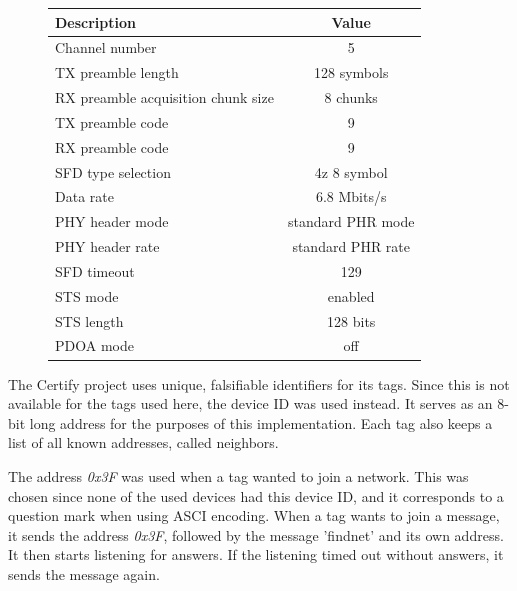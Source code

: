 \begin{figure}[ht]
\caption{Configurations of the DWM3000 for UWB communication}
\begin{longtable}{|l|c|}
\hline
\textbf{Description} & \textbf{Value} \\
\hline
\endfirsthead
\hline
\endfoot
Channel number & 5 \\
TX preamble length & 128 symbols \\
RX preamble acquisition chunk size & 8 chunks \\
TX preamble code & 9 \\
RX preamble code & 9 \\
SFD type selection & 4z 8 symbol\\
Data rate & 6.8 Mbits/s \\
PHY header mode & standard PHR mode \\
PHY header rate & standard PHR rate \\
SFD timeout & 129 \\
STS mode & enabled \\
STS length & 128 bits \\
PDOA mode & off \\
\hline
\end{longtable}
\label{table:DWM_settings}
\end{figure}


The Certify project uses unique, falsifiable identifiers for its tags.
Since this is not available for the tags used here, the device ID was used instead.
It serves as an 8-bit long address for the purposes of this implementation.
Each tag also keeps a list of all known addresses, called neighbors.


The address \textit{0x3F} was used when a tag wanted to join a network.
This was chosen since none of the used devices had this device ID, and it corresponds to a question mark when using ASCI encoding.
When a tag wants to join a message, it sends the address \textit{0x3F}, followed by the message 'findnet' and its own address.
It then starts listening for answers.
If the listening timed out without answers, it sends the message again.


